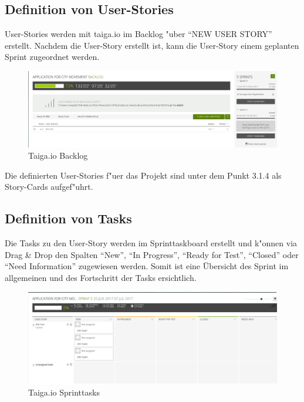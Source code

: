 \documentclass[a4paper, 11pt]{scrreprt}
\begin{document}
\subsection{Definition von User-Stories}

User-Stories werden mit taiga.io im Backlog "uber "`NEW USER STORY"' erstellt. Nachdem die User-Story erstellt ist, kann die User-Story einem geplanten Sprint zugeordnet werden.

\begin{figure} [H]
\begin{center}

\includegraphics[width=16cm]{backlog.png}
\caption{Taiga.io Backlog}

\end{center}
\end{figure}

Die definierten User-Stories f"uer das Projekt sind unter dem Punkt 3.1.4 als Story-Cards aufgef"uhrt.


\subsection{Definition von Tasks}

Die Tasks zu den User-Story werden im Sprinttaskboard erstellt und k"onnen via Drag \& Drop den Spalten "`New"', "`In Progress"', "`Ready for Test"', "`Closed"' oder "`Need Information"' zugewiesen werden. Somit ist eine Übersicht des Sprint im allgemeinen und des Fortschritt der Tasks ersichtlich.

\begin{figure} [H]
\begin{center}

\includegraphics[width=16cm]{sprint_tasks.png}
\caption{Taiga.io Sprinttasks}

\end{center}
\end{figure}
\end{document}
